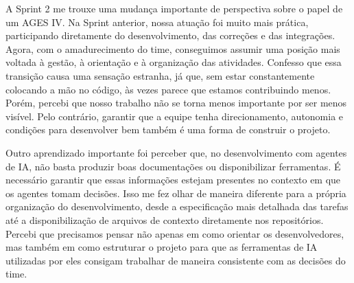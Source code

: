 \begin{reflection}
\noindent A Sprint 2 me trouxe uma mudança importante de perspectiva sobre o papel de um AGES IV. Na Sprint anterior, nossa atuação foi muito mais prática, participando diretamente do desenvolvimento, das correções e das integrações. Agora, com o amadurecimento do time, conseguimos assumir uma posição mais voltada à gestão, à orientação e à organização das atividades. Confesso que essa transição causa uma sensação estranha, já que, sem estar constantemente colocando a mão no código, às vezes parece que estamos contribuindo menos. Porém, percebi que nosso trabalho não se torna menos importante por ser menos visível. Pelo contrário, garantir que a equipe tenha direcionamento, autonomia e condições para desenvolver bem também é uma forma de construir o projeto.\par

\noindent Outro aprendizado importante foi perceber que, no desenvolvimento com agentes de IA, não basta produzir boas documentações ou disponibilizar ferramentas. É necessário garantir que essas informações estejam presentes no contexto em que os agentes tomam decisões. Isso me fez olhar de maneira diferente para a própria organização do desenvolvimento, desde a especificação mais detalhada das tarefas até a disponibilização de arquivos de contexto diretamente nos repositórios. Percebi que precisamos pensar não apenas em como orientar os desenvolvedores, mas também em como estruturar o projeto para que as ferramentas de IA utilizadas por eles consigam trabalhar de maneira consistente com as decisões do time.\par
\end{reflection}

